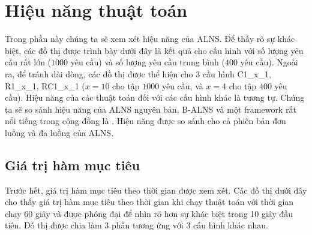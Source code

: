 \section{Hiệu năng thuật toán}
\label{sec:performance}
Trong phần này chúng ta sẽ xem xét hiệu năng của ALNS. Để thấy rõ sự khác biệt, các đồ thị được trình bày dưới đây là kết quả cho cấu hình với số lượng yêu cầu rất lớn ($1000$ yêu cầu) và số lượng yêu cầu trung bình ($400$ yêu cầu). Ngoài ra, để tránh dài dòng, các đồ thị được thể hiện cho 3 cầu hình C1\_x\_1, R1\_x\_1, RC1\_x\_1 ($x = 10$ cho tập $1000$ yêu cầu, và $x=4$ cho tập $400$ yêu cầu). Hiệu năng của các thuật toán đối với các cấu hình khác là tương tự. Chúng ta sẽ so sánh hiệu năng của ALNS nguyên bản, B-ALNS và một framework rất nổi tiếng trong cộng đồng là . Hiệu năng được so sánh cho cả phiên bản đơn luồng và đa luồng của ALNS.

\subsection{Giá trị hàm mục tiêu}

Trước hết, giá trị hàm mục tiêu theo thời gian được xem xét. Các đồ thị dưới đây cho thấy giá trị hàm mục tiêu theo thời gian khi chạy thuật toán với thời gian chạy 60 giây và được phóng đại để nhìn rõ hơn sự khác biệt trong 10 giây đầu tiên. Đồ thị được chia làm 3 phần tương ứng với 3 cấu hình khác nhau.

